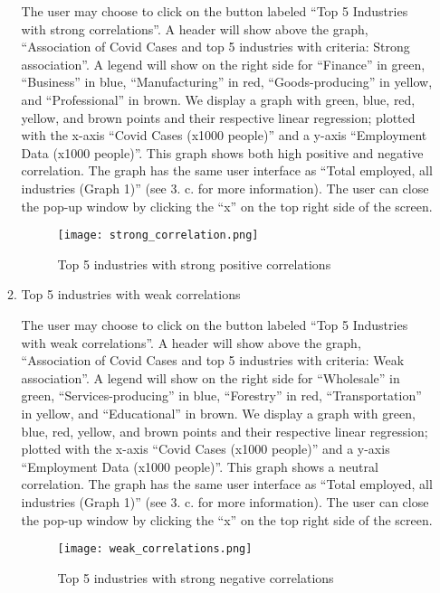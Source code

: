 \documentclass[fontsize=11pt]{article}
\begin{document}
\begin{enumerate}
\begin{enumerate}
The user may choose to click on the button labeled ``Top 5 Industries with strong correlations”. A header will show above the graph, ``Association of Covid Cases and top 5 industries with criteria: Strong association”. A legend will show on the right side for ``Finance” in green, ``Business” in blue, ``Manufacturing” in red, ``Goods-producing” in yellow, and ``Professional” in brown. We display a graph with green, blue, red, yellow, and brown points and their respective linear regression; plotted with the x-axis ``Covid Cases (x1000 people)” and a y-axis ``Employment Data (x1000 people)”. This graph shows both high positive and negative correlation. The graph has the same user interface as ``Total employed, all industries (Graph 1)” (see 3. c. for more information). The user can close the pop-up window by clicking the ``x” on the top right side of the screen.

\begin{figure}[h!]
  \caption{Top 5 industries with strong positive correlations}
\centering
\texttt{[image: strong\_correlation.png]}
\end{figure}

\raggedright

\item Top 5 industries with weak correlations

The user may choose to click on the button labeled ``Top 5 Industries with weak correlations”. A header will show above the graph, ``Association of Covid Cases and top 5 industries with criteria: Weak association”. A legend will show on the right side for ``Wholesale” in green, ``Services-producing” in blue, ``Forestry” in red, ``Transportation” in yellow, and ``Educational” in brown. We display a graph with green, blue, red, yellow, and brown points and their respective linear regression; plotted with the x-axis ``Covid Cases (x1000 people)” and a y-axis ``Employment Data (x1000 people)”. This graph shows a neutral correlation. The graph has the same user interface as ``Total employed, all industries (Graph 1)” (see 3. c. for more information). The user can close the pop-up window by clicking the ``x” on the top right side of the screen.


\begin{figure}[h!]
  \caption{Top 5 industries with strong negative correlations}

\centering
\texttt{[image: weak\_correlations.png]}

\end{figure}


\raggedright
\end{enumerate}

\end{enumerate}
\end{document}
